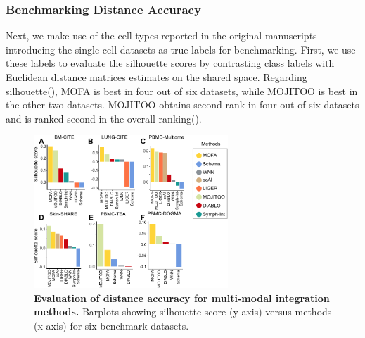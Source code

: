 \subsubsection{Benchmarking Distance Accuracy}
Next, we make use of the cell types reported in the original manuscripts introducing the single-cell datasets as true labels for benchmarking. First, we use these labels to evaluate the silhouette scores by contrasting class labels with Euclidean distance matrices estimates on the shared space. Regarding silhouette(), MOFA is best in four out of six datasets, while MOJITOO is best in the other two datasets. MOJITOO obtains second rank in four out of six datasets and is ranked second in the overall ranking(). 
\begin{figure}[!ht]
	\centering
	\includegraphics[width=0.65\textwidth]{silouette/fig}
	\vspace{0.1cm}
	\caption[Evaluation of distance accuracy for multi-modal integration methods.]{
        \textbf{Evaluation of distance accuracy for multi-modal integration methods.} Barplots showing silhouette score (y-axis) versus methods (x-axis) for six benchmark datasets. }
	\label{fig:silouette}
\end{figure}


